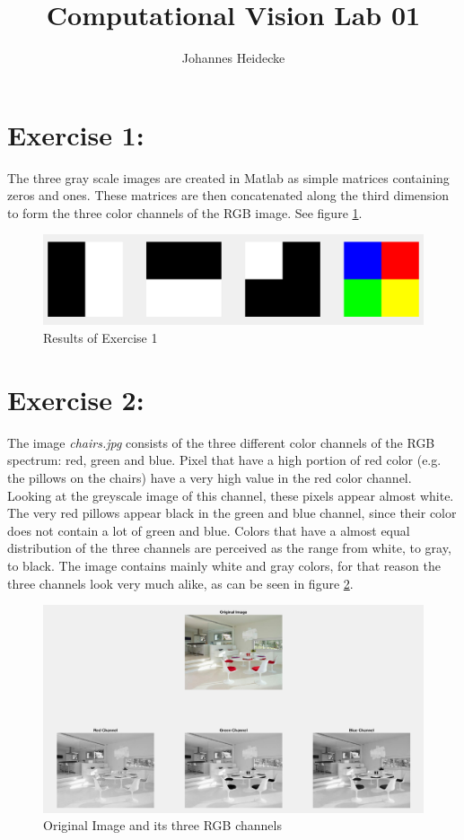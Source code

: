 \documentclass[11pt]{article}
\title{Computational Vision Lab 01}
\author{Johannes Heidecke}
\begin{document}
\maketitle


\section*{Exercise 1:}

The three gray scale images are created in Matlab as simple matrices containing zeros and ones. These matrices are then concatenated along the third dimension to form the three color channels of the RGB image. See figure \ref{fig:task1}.

\begin{figure}[!hbt]
  \includegraphics[width=\textwidth]{task1}
  \caption{Results of Exercise 1}
  \label{fig:task1}
\end{figure}


\section*{Exercise 2:}

The image \textit{chairs.jpg} consists of the three different color channels of the RGB spectrum: red, green and blue. Pixel that have a high portion of red color (e.g. the pillows on the chairs) have a very high value in the red color channel. Looking at the greyscale image of this channel, these pixels appear almost white. The very red pillows appear black in the green and blue channel, since their color does not contain a lot of green and blue. Colors that have a almost equal distribution of the three channels are perceived as the range from white, to gray, to black. The image contains mainly white and gray colors, for that reason the three channels look very much alike, as can be seen in figure \ref{fig:task2}.

\begin{figure}[!hbt]
  \includegraphics[width=\textwidth]{task2}
  \caption{Original Image and its three RGB channels}
  \label{fig:task2}
\end{figure}
\end{document}
